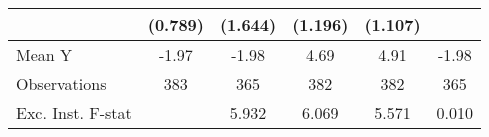 {\begin{tabular}{l*{5}{c}}
            &     (0.789)         &     (1.644)         &     (1.196)         &     (1.107)         &                     \\
\midrule
Mean Y      &       -1.97         &       -1.98         &        4.69         &        4.91         &       -1.98         \\
Observations&         383         &         365         &         382         &         382         &         365         \\
Exc. Inst. F-stat&                     &       5.932         &       6.069         &       5.571         &       0.010         \\
\bottomrule
\end{tabular}
}
